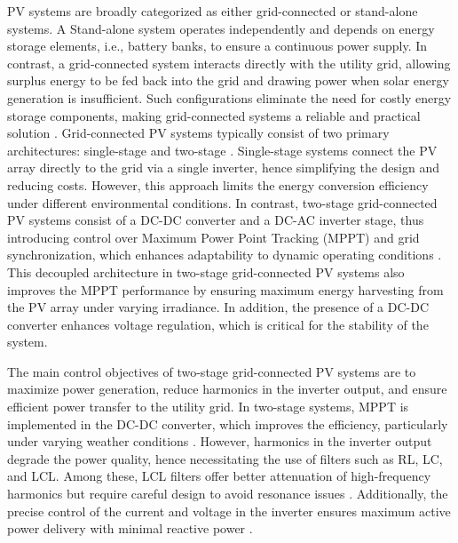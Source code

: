\documentclass[preprint,12pt]{elsarticle}
\begin{document}
PV systems are broadly categorized as either grid-connected or stand-alone systems. A Stand-alone system operates independently and depends on energy storage elements, i.e., battery banks, to ensure a continuous power supply. In contrast, a grid-connected system interacts directly with the utility grid, allowing surplus energy to be fed back into the grid and drawing power when solar energy generation is insufficient. Such configurations eliminate the need for costly energy storage components, making grid-connected systems a reliable and practical solution \cite{carrasco2006power}. Grid-connected PV systems typically consist of two primary architectures: single-stage and two-stage \cite{trujillo2016modeling}. Single-stage systems connect the PV array directly to the grid via a single inverter, hence simplifying the design and reducing costs. However, this approach limits the energy conversion efficiency under different environmental conditions. In contrast, two-stage grid-connected PV systems consist of a DC-DC converter and a DC-AC inverter stage, thus introducing control over Maximum Power Point Tracking (MPPT) and grid synchronization, which enhances adaptability to dynamic operating conditions \cite{kouro2015grid}. This decoupled architecture in two-stage grid-connected PV systems also improves the MPPT performance by ensuring maximum energy harvesting from the PV array under varying irradiance. In addition, the presence of a DC-DC converter enhances voltage regulation, which is critical for the stability of the system. 

The main control objectives of two-stage grid-connected PV systems are to maximize power generation, reduce harmonics in the inverter output, and ensure efficient power transfer to the utility grid. In two-stage systems, MPPT is implemented in the DC-DC converter, which improves the efficiency, particularly under varying weather conditions \cite{trujillo2016modeling}. However, harmonics in the inverter output degrade the power quality, hence necessitating the use of filters such as RL, LC, and LCL. Among these, LCL filters offer better attenuation of high-frequency harmonics but require careful design to avoid resonance issues \cite{li2023harmonic}. Additionally, the precise control of the current and voltage in the inverter ensures maximum active power delivery with minimal reactive power \cite{ahmed2022evaluation}. 
\end{document}

